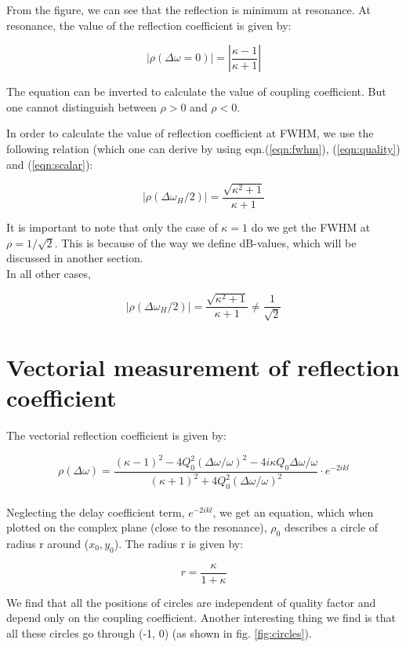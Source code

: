 \documentclass[a4paper]{article}
\numberwithin{equation}{section}
\begin{document}
From the figure, we can see that the reflection is minimum at resonance. At resonance, the value of the reflection coefficient is given by:

\begin{equation}
		\left| \rho (\Delta \omega = 0) \right| = \left| \frac{\kappa - 1}{\kappa +1} \right| 
\end{equation}

The equation can be inverted to calculate the value of coupling coefficient. But one cannot distinguish between $\rho >0$ and $\rho<0$. 

In order to calculate the value of reflection coefficient at FWHM, we use the following relation (which one can derive by using eqn.(\ref{eqn:fwhm}), (\ref{eqn:quality}) and (\ref{eqn:scalar}):

\begin{equation}
		\left| \rho (\Delta \omega_{H}/2) \right| = \frac{\sqrt{\kappa^2 + 1} }{\kappa +1} 
\end{equation}

It is important to note that only the case of $\kappa = 1$ do we get the FWHM at $\rho = 1 / \sqrt{2} $. This is because of the way we define dB-values, which will be discussed in another section. \\
In all other cases, 

\[
		\left| \rho (\Delta \omega_{H}/2) \right| = \frac{\sqrt{\kappa^2 + 1} }{\kappa +1} \ne \frac{1}{\sqrt{2} } 
\]

\section{Vectorial measurement of reflection coefficient}
The vectorial reflection coefficient is given by: 

\begin{equation}
		\rho (\Delta \omega) = \frac{(\kappa - 1)^2 - 4Q_{0}^2 \left(\Delta \omega / \omega \right)^2 - 4i \kappa Q_{0} \Delta\omega / \omega}{(\kappa + 1)^2 + 4Q_{0}^2 \left(\Delta \omega / \omega \right)^2}  \cdot e^{-2ikl}
\end{equation}
\\
Neglecting the delay coefficient term, $e^{-2ikl}$, we get an equation, which when plotted on the complex plane (close to the resonance), $\rho_{0}$ describes a circle of radius r around ($x_{0}, y_{0}$).  The radius r is given by: 

\[
		r = \frac{\kappa}{1+ \kappa}
\]

We find that all the positions of circles are independent of quality factor and depend only on the coupling coefficient. Another interesting thing we find is that all these circles go through (-1, 0) (as shown in fig. \ref{fig:circles}). 
\end{document}
